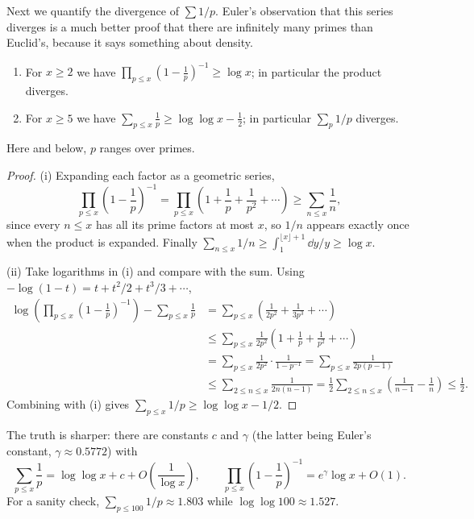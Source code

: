 \documentclass[a4paper]{scrartcl}
\begin{document}
Next we quantify the divergence of $\sum 1/p$. Euler's observation that this series diverges is a much better proof that there are infinitely many primes than Euclid's, because it says something about density.

\begin{theorem}[Mertens]\label{thm:mertens}
	\begin{enumerate}[label=(\roman*)]
		\item For $x \geq 2$ we have $\displaystyle\prod_{p \leq x}\left(1 - \frac1p\right)^{-1} \geq \log x$; in particular the product diverges.
		\item For $x \geq 5$ we have $\displaystyle\sum_{p \leq x}\frac1p \geq \log\log x - \frac12$; in particular $\sum_p 1/p$ diverges.
	\end{enumerate}
	Here and below, $p$ ranges over primes.
\end{theorem}
\begin{proof}
	(i) Expanding each factor as a geometric series,
	$$
	\prod_{p \leq x}\left(1 - \frac1p\right)^{-1} = \prod_{p \leq x}\left(1 + \frac1p + \frac1{p^2} + \cdots\right) \geq \sum_{n \leq x}\frac1n,
	$$
	since every $n \leq x$ has all its prime factors at most $x$, so $1/n$ appears exactly once when the product is expanded. Finally $\sum_{n \leq x}1/n \geq \int_1^{\lfloor x\rfloor + 1}\dd y/y \geq \log x$.

	(ii) Take logarithms in (i) and compare with the sum. Using $-\log(1 - t) = t + t^2/2 + t^3/3 + \cdots$,
	\begin{align*}
		\log\left(\prod_{p \leq x}\left(1 - \frac1p\right)^{-1}\right) - \sum_{p\leq x}\frac1p &= \sum_{p \leq x}\left(\frac1{2p^2} + \frac1{3p^3} + \cdots\right) \\
		&\leq \sum_{p \leq x}\frac1{2p^2}\left(1 + \frac1p + \frac1{p^2} + \cdots\right) \\
		&= \sum_{p \leq x}\frac{1}{2p^2}\cdot\frac{1}{1 - p^{-1}} = \sum_{p \leq x}\frac1{2p(p-1)} \\
		&\leq \sum_{2 \leq n \leq x}\frac1{2n(n-1)} = \frac12\sum_{2\leq n \leq x}\left(\frac1{n-1} - \frac1n\right) \leq \frac12.
	\end{align*}
	Combining with (i) gives $\sum_{p \leq x}1/p \geq \log\log x - 1/2$.
\end{proof}

\begin{remark}
	The truth is sharper: there are constants $c$ and $\gamma$ (the latter being Euler's constant, $\gamma \approx 0.5772$) with
	$$
	\sum_{p \leq x}\frac1p = \log\log x + c + O\!\left(\frac1{\log x}\right), \qquad \prod_{p\leq x}\left(1 - \frac1p\right)^{-1} = e^\gamma \log x + O(1).
	$$
	For a sanity check, $\sum_{p \leq 100}1/p \approx 1.803$ while $\log\log 100 \approx 1.527$.
\end{remark}
\end{document}
